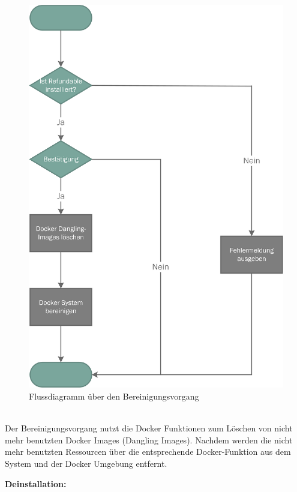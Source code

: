 \begin{figure}[H]
	\centering
	\includegraphics[width=0.55\linewidth]{images/mbeier_konzept/Clean}
	\caption[Flussdiagramm über den Bereinigungsvorgang]{Flussdiagramm über den Bereinigungsvorgang}
	\label{fig:clean}
\end{figure}
~\\
Der Bereinigungsvorgang nutzt die Docker Funktionen zum Löschen von nicht mehr benutzten Docker Images (Dangling Images). Nachdem werden die nicht mehr benutzten Ressourcen über die entsprechende Docker-Funktion aus dem System und der Docker Umgebung entfernt.

\newpage

\textbf{Deinstallation:}

